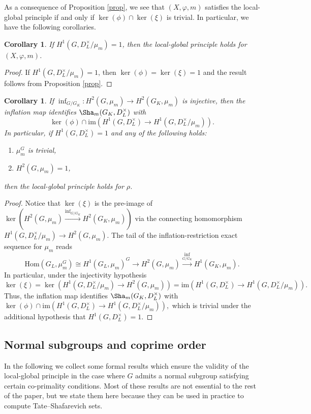 \documentclass[a4paper,10pt]{amsart}
\theoremstyle{plain}
\newtheorem{corollary}[theorem]{Corollary}
\theoremstyle{definition}
\theoremstyle{remark}
\def\mr#1{\mathrm{#1}}
\def\im{\mr{im}}
\newcommand{\bD}{D_L}
\renewcommand{\hom}{\mr{Hom}}
\begin{document}
As a consequence of Proposition \ref{prop}, we see that
\((X, \varphi, m)\) satisfies the local-global principle if and only if \(\ker(\phi)\cap\ker(\xi)\) is trivial. 
In particular, we have the following corollaries. 

\begin{corollary}\label{coro1}
If \(H^1(G,\bD^\times/\mu_m) = 1\), then the local-global principle holds for \((X, \varphi, m)\).  
\end{corollary}
\begin{proof}
   If \(H^1(G,\bD^\times/\mu_m) = 1\), then \(\ker(\phi) = \ker(\xi) = 1\) and the result follows from Proposition \ref{prop}. 
\end{proof}


\begin{corollary}\label{coro2}
If \(\inf_{G/G_K} \colon H^2(G, \mu_m) \to H^2(G_K, \mu_m)\) is injective, then the inflation map identifies \(\Sha_m(G_K, \bD^\times)\) with
\[\ker(\phi)\cap \im(H^1(G, \bD^\times) \longrightarrow H^1(G, \bD^\times/\mu_m)).\]
In particular, if \(H^1(G, \bD^\times) = 1\) and any of the following holds:
\begin{enumerate}
    \item \(\mu_m^G\) is trivial, 
    \item \(H^2(G, \mu_m) = 1\),
\end{enumerate}
then the local-global principle holds for \(\rho\).   
\end{corollary}
\begin{proof}
Notice that \(\ker(\xi)\) is the pre-image of \(\ker(H^2(G,\mu_m)\xrightarrow{\inf_{G/G_K}}H^2(G_K, \mu_m))\) via the connecting homomorphism \(H^1(G, \bD^\times/\mu_m) \to H^2(G, \mu_m)\). The tail of the inflation-restriction exact sequence for \(\mu_m\) reads
\[
    \hom(G_L, \mu_m^G) \cong H^1(G_L, \mu_m)^G \longrightarrow H^2(G,\mu_m)\xrightarrow{\inf_{G/G_K}}H^1(G_K, \mu_m).
\]
In particular, under the injectivity hypothesis
\[
    \ker(\xi) = \ker(H^1(G, \bD^\times/\mu_m) \to H^2(G, \mu_m)) = \im(H^1(G, \bD^\times) \to H^1(G, \bD^\times/\mu_m)).
\]
Thus, the inflation map identifies \(\Sha_m(G_K, \bD^\times)\) with
\(\ker(\phi)\cap \im(H^1(G, \bD^\times) \to H^1(G, \bD^\times/\mu_m)),\)
which is trivial under the additional hypothesis that \(H^1(G, \bD^\times) = 1\).
\end{proof}

\subsection{Normal subgroups and coprime order} 
In the following we collect some formal results which ensure the validity of the local-global principle in the case where \(G\) admits a normal subgroup satisfying certain co-primality conditions.
Most of these results are not essential to the rest of the paper, but we state them here because they can be used in practice to compute Tate--Shafarevich sets.
\end{document}
